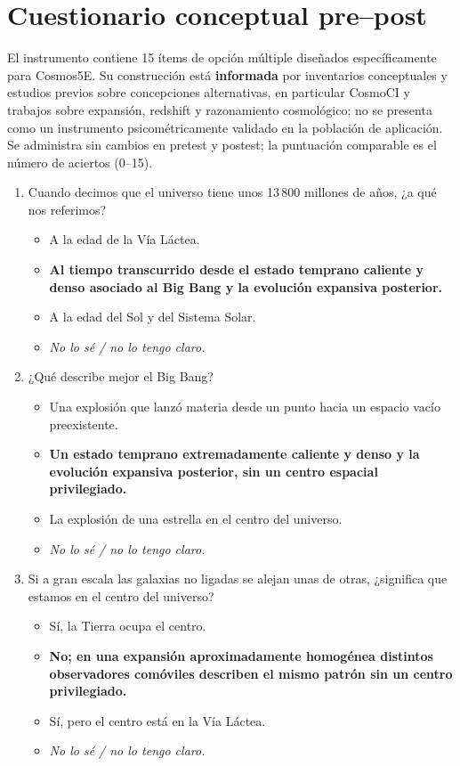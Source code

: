 \clearpage
\section*{Cuestionario conceptual pre--post}

El instrumento contiene 15 ítems de opción múltiple diseñados específicamente para Cosmos5E. Su construcción está \textbf{informada} por inventarios conceptuales y estudios previos sobre concepciones alternativas, en particular CosmoCI y trabajos sobre expansión, redshift y razonamiento cosmológico; no se presenta como un instrumento psicométricamente validado en la población de aplicación. Se administra sin cambios en pretest y postest; la puntuación comparable es el número de aciertos (0--15).

\begin{enumerate}[leftmargin=*]
\item Cuando decimos que el universo tiene unos 13\,800 millones de años, ¿a qué nos referimos?
\begin{itemize}
\item A la edad de la Vía Láctea.
\item \textbf{Al tiempo transcurrido desde el estado temprano caliente y denso asociado al Big Bang y la evolución expansiva posterior.}
\item A la edad del Sol y del Sistema Solar.
\item \textit{No lo sé / no lo tengo claro.}
\end{itemize}

\item ¿Qué describe mejor el Big Bang?
\begin{itemize}
\item Una explosión que lanzó materia desde un punto hacia un espacio vacío preexistente.
\item \textbf{Un estado temprano extremadamente caliente y denso y la evolución expansiva posterior, sin un centro espacial privilegiado.}
\item La explosión de una estrella en el centro del universo.
\item \textit{No lo sé / no lo tengo claro.}
\end{itemize}

\item Si a gran escala las galaxias no ligadas se alejan unas de otras, ¿significa que estamos en el centro del universo?
\begin{itemize}
\item Sí, la Tierra ocupa el centro.
\item \textbf{No; en una expansión aproximadamente homogénea distintos observadores comóviles describen el mismo patrón sin un centro privilegiado.}
\item Sí, pero el centro está en la Vía Láctea.
\item \textit{No lo sé / no lo tengo claro.}
\end{itemize}


\end{enumerate}
